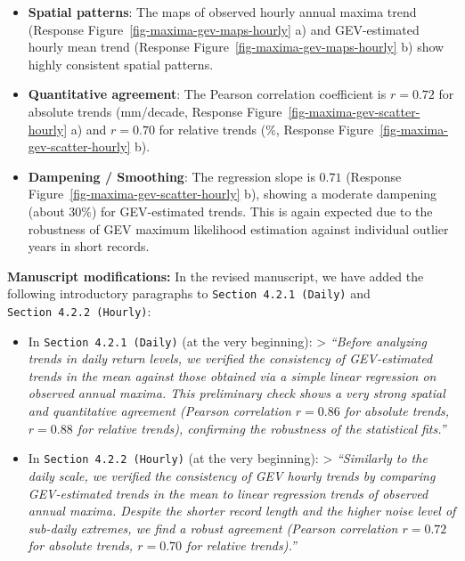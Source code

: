 \documentclass[
  letterpaper,
  DIV=11,
  numbers=noendperiod]{scrartcl}
\providecommand{\tightlist}{%
  \setlength{\itemsep}{0pt}\setlength{\parskip}{0pt}}\usepackage{longtable,booktabs,array}
\begin{document}
\begin{itemize}
\tightlist
\item
  \textbf{Spatial patterns}: The maps of observed hourly annual maxima
  trend (Response Figure~\ref{fig-maxima-gev-maps-hourly} a) and
  GEV-estimated hourly mean trend (Response
  Figure~\ref{fig-maxima-gev-maps-hourly} b) show highly consistent
  spatial patterns.
\item
  \textbf{Quantitative agreement}: The Pearson correlation coefficient
  is \textbf{\(r = 0.72\)} for absolute trends (mm/decade, Response
  Figure~\ref{fig-maxima-gev-scatter-hourly} a) and
  \textbf{\(r = 0.70\)} for relative trends (\%, Response
  Figure~\ref{fig-maxima-gev-scatter-hourly} b).
\item
  \textbf{Dampening / Smoothing}: The regression slope is
  \textbf{\(0.71\)} (Response Figure~\ref{fig-maxima-gev-scatter-hourly}
  b), showing a moderate dampening (about 30\%) for GEV-estimated
  trends. This is again expected due to the robustness of GEV maximum
  likelihood estimation against individual outlier years in short
  records.
\end{itemize}

\textbf{Manuscript modifications:} In the revised manuscript, we have
added the following introductory paragraphs to
\texttt{Section\ 4.2.1\ (Daily)} and \texttt{Section\ 4.2.2\ (Hourly)}:

\begin{itemize}
\item
  In \texttt{Section\ 4.2.1\ (Daily)} (at the very beginning):
  \textgreater{} \emph{``Before analyzing trends in daily return levels,
  we verified the consistency of GEV-estimated trends in the mean
  against those obtained via a simple linear regression on observed
  annual maxima. This preliminary check shows a very strong spatial and
  quantitative agreement (Pearson correlation \(r = 0.86\) for absolute
  trends, \(r = 0.88\) for relative trends), confirming the robustness
  of the statistical fits.''}
\item
  In \texttt{Section\ 4.2.2\ (Hourly)} (at the very beginning):
  \textgreater{} \emph{``Similarly to the daily scale, we verified the
  consistency of GEV hourly trends by comparing GEV-estimated trends in
  the mean to linear regression trends of observed annual maxima.
  Despite the shorter record length and the higher noise level of
  sub-daily extremes, we find a robust agreement (Pearson correlation
  \(r = 0.72\) for absolute trends, \(r = 0.70\) for relative
  trends).''}
\end{itemize}
\end{document}
